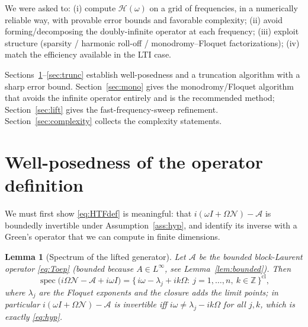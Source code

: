 \documentclass{amsart}
\newtheorem{lemma}{Lemma}
\theoremstyle{definition}
\DeclareMathOperator{\spec}{spec}
\newcommand{\Z}{\mathbb{Z}}
\newcommand{\Acal}{\mathcal{A}}
\newcommand{\Hcal}{\mathcal{H}}
\newcommand{\Ncal}{\mathcal{N}}
\begin{document}
\medskip
We were asked to: (i) compute $\Hcal(\omega)$ on a grid of frequencies, in a
numerically reliable way, with provable error bounds and favorable complexity;
(ii) avoid forming/decomposing the doubly-infinite operator at each frequency;
(iii) exploit structure (sparsity / harmonic roll-off / monodromy–Floquet
factorizations); (iv) match the efficiency available in the LTI case.

Sections~\ref{sec:wellposed}--\ref{sec:trunc} establish well-posedness and a
truncation algorithm with a sharp error bound. Section~\ref{sec:mono} gives the
monodromy/Floquet algorithm that avoids the infinite operator entirely and is
the recommended method; Section~\ref{sec:lift} gives the
fast-frequency-sweep refinement. Section~\ref{sec:complexity} collects the
complexity statements.

\section{Well-posedness of the operator definition}\label{sec:wellposed}

We must first show \eqref{eq:HTFdef} is meaningful: that
$i(\omega I+\Omega\Ncal)-\Acal$ is boundedly invertible under
Assumption~\ref{ass:hyp}, and identify its inverse with a Green's operator that
we can compute in finite dimensions.

\begin{lemma}[Spectrum of the lifted generator]\label{lem:spectrum}
Let $\Acal$ be the bounded block-Laurent operator \eqref{eq:Toep} (bounded
because $A\in L^\infty$, see Lemma~\ref{lem:bounded}). Then
\begin{equation}\label{eq:specG}
\spec\!\big(i\Omega\Ncal-\Acal+i\omega I\big)
=\big\{\,i\omega-\lambda_j+i k\Omega:\ j=1,\dots,n,\ k\in\Z\,\big\}^{\mathrm{cl}},
\end{equation}
where $\lambda_j$ are the Floquet exponents and the closure adds the limit
points; in particular $i(\omega I+\Omega\Ncal)-\Acal$ is invertible iff
$i\omega\ne\lambda_j-ik\Omega$ for all $j,k$, which is exactly \eqref{eq:hyp}.
\end{lemma}
\end{document}
